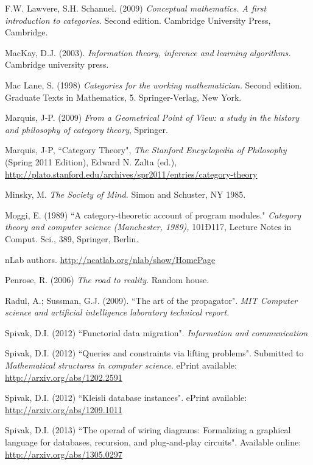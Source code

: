 \documentclass{book}
\theoremstyle{remark}
\theoremstyle{definition}
\begin{document}
\begin{thebibliography}{SGWB}
 F.W. Lawvere, S.H. Schanuel. (2009) {\em Conceptual mathematics. 
A first introduction to categories.} Second edition. Cambridge University Press, Cambridge.

 MacKay, D.J. (2003). {\em Information theory, inference and learning algorithms.} Cambridge university press.

 Mac Lane, S. (1998) {\em Categories for the working mathematician.} Second edition. Graduate Texts in Mathematics, 5. Springer-Verlag, New York.

 Marquis, J-P. (2009) {\em From a Geometrical Point of View: a study in the history and philosophy of category theory}, Springer.

 Marquis, J-P, ``Category Theory", {\em The Stanford Encyclopedia of Philosophy} (Spring 2011 Edition), Edward N. Zalta (ed.), \url{http://plato.stanford.edu/archives/spr2011/entries/category-theory}

 Minsky, M. {\em The Society of Mind.}  Simon and Schuster, NY 1985.

 Moggi, E. (1989) ``A category-theoretic account of program modules." {\em Category theory and computer science (Manchester, 1989),} 101Ð117, Lecture Notes in Comput. Sci., 389, Springer, Berlin. 

 nLab authors.  \url{http://ncatlab.org/nlab/show/HomePage}

 Penrose, R. (2006) {\em The road to reality}. Random house.

 Radul, A.; Sussman, G.J. (2009). ``The art of the propagator". {\em MIT Computer science and artificial intelligence laboratory technical report.}

 Spivak, D.I. (2012) ``Functorial data migration". {\em Information and communication} 

 Spivak, D.I. (2012) ``Queries and constraints via lifting problems". Submitted to {\em Mathematical structures in computer science}. ePrint available: \url{http://arxiv.org/abs/1202.2591}

 Spivak, D.I. (2012) ``Kleisli database instances". ePrint available: \url{http://arxiv.org/abs/1209.1011}

 Spivak, D.I. (2013) ``The operad of wiring diagrams: Formalizing a graphical language for databases, recursion, and plug-and-play circuits". Available online: \url{http://arxiv.org/abs/1305.0297}


\end{thebibliography}
\end{document}
